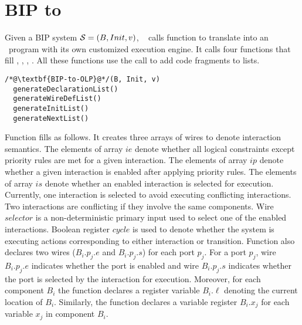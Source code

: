 \section{BIP to \caig}
\label{sec:bip2aig}
%
Given a BIP system $\mathcal{S} = (B, Init, v)$, \biptool~
calls function  to translate \Pm into 
an \caig~program with its own customized execution engine. 
It calls four functions that fill , , , . 
All these functions use the  call to add code fragments to lists. 
%
\begin{lstlisting}
/*@\textbf{BIP-to-OLP}@*/(B, Init, v)
  generateDeclarationList()
  generateWireDefList()
  generateInitList()
  generateNextList()
\end{lstlisting}
%
Function  fills  as follows. 
It creates three arrays of wires to denote interaction semantics. 
The elements of array $\mathit{ie}$ denote whether all logical constraints except priority rules are met for a given interaction. 
The elements of array $\mathit{ip}$ denote whether a given interaction is enabled after applying priority rules. 
The elements of array $\mathit{is}$ denote whether an enabled interaction is selected for execution. 
Currently, one interaction is selected to avoid executing conflicting interactions. 
Two interactions are conflicting if they involve the same components. 
Wire $\mathit{selector}$ is a non-deterministic primary input used to select one of the enabled interactions.
Boolean register $\mathit{cycle}$ is used to denote whether the system is executing actions corresponding to either interaction or transition. 
Function  also declares two wires ($B_i.p_j.e$ and $B_i.p_j.s$) for each port $p_j$. 
For a port $p_j$, wire $B_i.p_j.e$ indicates whether the port is enabled and wire $B_i.p_j.s$ indicates whether the port is selected by the interaction for execution. 
Moreover, for each component $B_i$ the function declares a register variable $B_i.\ell$ denoting the current location of $B_i$. 
Similarly, the function declares a variable register $B_i.x_j$ for each variable $x_j$ in component $B_i$.  

